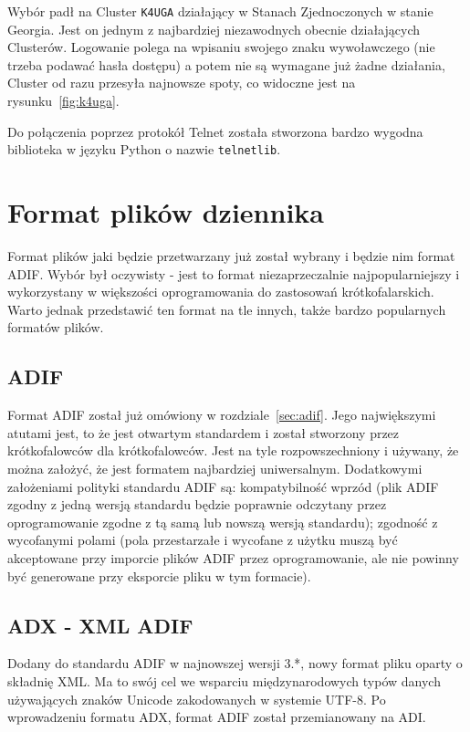 \documentclass[]{mgr}
\begin{document}
        Wybór padł na Cluster \texttt{K4UGA} działający w Stanach Zjednoczonych w stanie Georgia. Jest on jednym z najbardziej niezawodnych obecnie działających Clusterów. Logowanie polega na wpisaniu swojego znaku wywoławczego (nie trzeba podawać hasła dostępu) a potem nie są wymagane już żadne działania, Cluster od razu przesyła najnowsze spoty, co widoczne jest na rysunku~\ref{fig:k4uga}.

        Do połączenia poprzez protokół Telnet została stworzona bardzo wygodna biblioteka w języku Python o nazwie \texttt{telnetlib}.

        \section{Format plików dziennika}
        Format plików jaki będzie przetwarzany już został wybrany i będzie nim format ADIF. Wybór był oczywisty - jest to format niezaprzeczalnie najpopularniejszy i wykorzystany w większości oprogramowania do zastosowań krótkofalarskich. Warto jednak przedstawić ten format na tle innych, także bardzo popularnych formatów plików.

            \subsection{ADIF}
            Format ADIF został już omówiony w rozdziale~\ref{sec:adif}. Jego największymi atutami jest, to że jest otwartym standardem i został stworzony przez krótkofalowców dla krótkofalowców. Jest na tyle rozpowszechniony i używany, że można założyć, że jest formatem najbardziej uniwersalnym. Dodatkowymi założeniami polityki standardu ADIF są: kompatybilność wprzód (plik ADIF zgodny z jedną wersją standardu będzie poprawnie odczytany przez oprogramowanie zgodne z tą samą lub nowszą wersją standardu); zgodność z wycofanymi polami (pola przestarzałe i wycofane z użytku muszą być akceptowane przy imporcie plików ADIF przez oprogramowanie, ale nie powinny być generowane przy eksporcie pliku w tym formacie).

            \subsection{ADX - XML ADIF}
            Dodany do standardu ADIF w najnowszej wersji 3.*, nowy format pliku oparty o składnię XML. Ma to swój cel we wsparciu międzynarodowych typów danych używających znaków Unicode zakodowanych w systemie UTF-8. Po wprowadzeniu formatu ADX, format ADIF został przemianowany na ADI.
\end{document}
